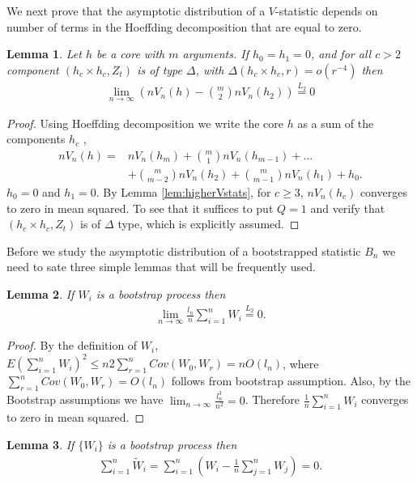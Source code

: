\documentclass{article} %
\newtheorem{lemma}{Lemma}
\newcommand{\ev}{E}
\begin{document}
We next  prove that the asymptotic distribution of a $V$-statistic depends on number of terms in the  Hoeffding decomposition that are equal to zero.

\begin{lemma}
\label{lem:equivVanila}
Let $h$ be a core with $m$ arguments. If $h_0=h_1=0$, and for all $c>2$  component  $(h_c \times h_c,Z_{t})$ is  of type $\varDelta$, with $\varDelta(h_c \times h_c,r) = o( r^{-4})$ then    
\begin{align*}
 \lim_{n \to \infty} \left( n V_n(h) -  \binom m 2  n V_n(h_2)  \right) \overset{L_2}{=} 0
\end{align*}
\end{lemma}

\begin{proof}
Using  Hoeffding decomposition we  write the core  $h$ as a sum of the components $h_c$ ,
\begin{align*}
  n V_n(h) =& n V_n(h_m) + \binom m 1 n V_n(h_{m-1}) + ... \\ 
  &+ \binom {m} {m-2} n V_n(h_{2}) + \binom {m} {m-1} n V_n(h_{1})+h_0.
\end{align*}
$h_0=0$ and  $h_1=0$. By  Lemma \ref{lem:higherVstats}, for $c \geq 3$, $n V_n(h_{c})$  converges to zero in mean squared. To see that it suffices to put $Q=1$ and verify that  $(h_c \times h_c,Z_t)$ is of $\varDelta$ type, which  is explicitly assumed.
\end{proof}

Before we study the asymptotic distribution of a bootstrapped statistic $B_n$ we need to sate three simple lemmas that will be frequently used.  
\begin{lemma}
\label{lem:meanWi}
If $W_i$ is a bootstrap process then
\begin{align*}
\lim_{n \to \infty} \frac {l_n}{ n} \sum_{i=1}^n W_i \overset{L_2}{=} 0.
\end{align*}
\end{lemma}
\begin{proof}
By the definition of $W_i$, $\ev (\sum_{i=1}^n W_i)^2 \leq n 2\sum_{r=1}^n Cov(W_0,W_r)=  nO(l_n)$, where $\sum_{r=1}^n Cov(W_0,W_r)=  O(l_n)$ follows from bootstrap assumption.  Also, by the  Bootstrap assumptions we have $\lim_{n \to \infty} \frac {l_n^3}{n^2} =0 $. Therefore $\frac{1} {n} \sum_{i=1}^{n}W_i$ converges to zero in mean squared.
\end{proof}


\begin{lemma}
\label{stmt:obviousD}
If $\{W_i\}$ is a bootstrap process then
\begin{align*}
\sum_{i=1}^n \tilde W_i = \sum_{i=1}^n  \left( W_i - \frac 1 n \sum_{j=1}^n  W_j \right) = 0. 
\end{align*}
\end{lemma}
\end{document}
